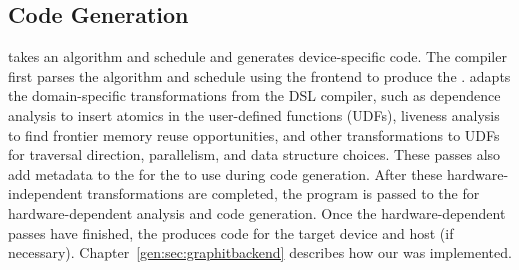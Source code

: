 \subsection{Code Generation}
\ugc takes an algorithm and schedule and generates device-specific code.
The compiler first parses the algorithm and schedule using the frontend to produce the \graphisa. 
\GG adapts the domain\hyp{}specific transformations from the \graphit DSL compiler, such as dependence analysis to insert atomics in the user\hyp{}defined functions (UDFs), liveness analysis to find frontier memory reuse opportunities, and other transformations to UDFs for
traversal direction, parallelism, and data structure choices.
These passes also add metadata to the \graphisa for the \graphvms to use during code generation.
After these hardware-independent transformations are completed, the program is passed to the \graphvm for hardware-dependent analysis and code generation.
Once the hardware-dependent passes have finished, the \graphvm produces code for the target device and host (if necessary).
Chapter~\ref{gen:sec:graphitbackend} describes how our \hb \graphvm was implemented.
